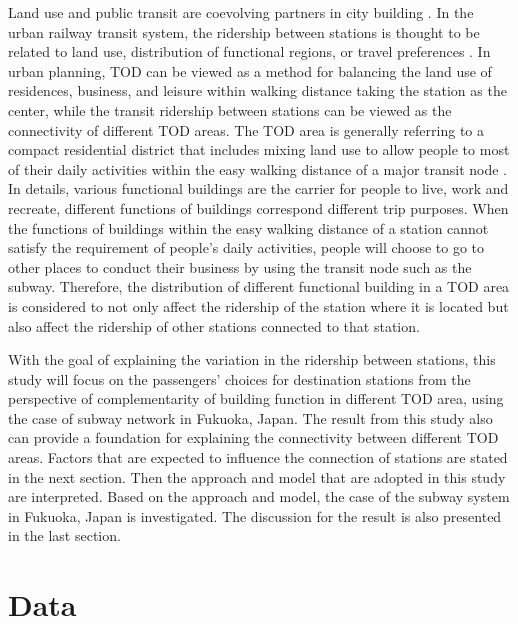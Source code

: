 %
Land use and public transit are coevolving partners in city building \cite{handy2005smart,dittmar2012new}. In the urban railway transit system, the ridership between stations is thought to be related to land use, distribution of functional regions, or travel preferences \cite{thompson1997achieving}. In urban planning, TOD can be viewed as a method for balancing the land use of residences, business, and leisure within walking distance taking the station as the center, while the transit ridership between stations can be viewed as the connectivity of different TOD areas. The TOD area is generally referring to a compact residential district that includes mixing land use to allow people to most of their daily activities within the easy walking distance of a major transit node \cite{lund2004travel}. In details, various functional buildings are the carrier for people to live, work and recreate, different functions of buildings correspond different trip purposes. When the functions of buildings within the easy walking distance of a station cannot satisfy the requirement of people’s daily activities, people will choose to go to other places to conduct their business by using the transit node such as the subway. Therefore, the distribution of different functional building in a TOD area is considered to not only affect the ridership of the station where it is located but also affect the ridership of other stations connected to that station.

%
With the goal of explaining the variation in the ridership between stations, this study will focus on the passengers’ choices for destination stations from the perspective of complementarity of building function in different TOD area, using the case of subway network in Fukuoka, Japan. The result from this study also can provide a foundation for explaining the connectivity between different TOD areas. Factors that are expected to influence the connection of stations are stated in the next section. Then the approach and model that are adopted in this study are interpreted. Based on the approach and model, the case of the subway system in Fukuoka, Japan is investigated. The discussion for the result is also presented in the last section.

%
\section{Data}

%
